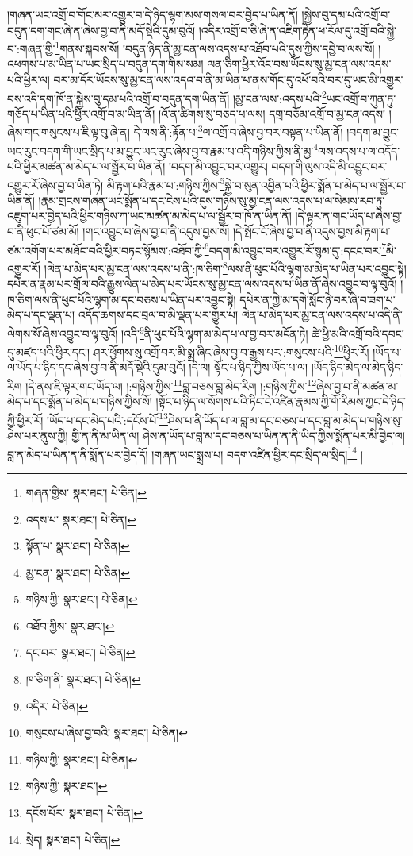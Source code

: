 །གཞན་ཡང་འགྲོ་བ་གོང་མར་འགྱུར་བ་དེ་ཉིད་ལྷག་མས་གསལ་བར་བྱེད་པ་ཡིན་ནོ། །སྐྱེས་བུ་དམ་པའི་འགྲོ་བ་བདུན་དག་གང་ཞེ་ན་ཞེས་བྱ་བ་ནི་མདོ་སྡེའི་དུམ་བུའོ། །འདིར་འགྲོ་བ་ཅི་ཞེ་ན་འཇིག་རྟེན་ཕ་རོལ་དུ་འགྲོ་བའི་སྐྱེ་བ་:གཞན་གྱི་\footnote{གཞན་གྱིས་  སྣར་ཐང་།  པེ་ཅིན། }གནས་སྐབས་སོ། །བདུན་ཉིད་ནི་མྱ་ངན་ལས་འདས་པ་འཐོབ་པའི་དུས་ཀྱིས་དབྱེ་བ་ལས་སོ། །འཕགས་པ་མ་ཡིན་པ་ཡང་སྲིད་པ་བདུན་དག་གིས་སམ། ལན་ཅིག་ཕྱིར་འོང་བས་ཡོངས་སུ་མྱ་ངན་ལས་འདས་པའི་ཕྱིར་ལ། བར་མ་དོར་ཡོངས་སུ་མྱ་ངན་ལས་འདའ་བ་ནི་མ་ཡིན་པ་ནས་གོང་དུ་འཕོ་བའི་བར་དུ་ཡང་མི་འགྱུར་བས་འདི་དག་ཁོ་ན་སྐྱེས་བུ་དམ་པའི་འགྲོ་བ་བདུན་དག་ཡིན་ནོ། །མྱ་ངན་ལས་:འདས་པའི་\footnote{འདས་པ་  སྣར་ཐང་།  པེ་ཅིན། }ཡང་འགྲོ་བ་ཀུན་ཏུ་གཅོད་པ་ཡིན་པའི་ཕྱིར་འགྲོ་བ་མ་ཡིན་ནོ། །འོ་ན་ཚིགས་སུ་བཅད་པ་ལས། དགྲ་བཅོམ་འགྲོ་བ་མྱ་ངན་འདས། །ཞེས་གང་གསུངས་པ་ཇི་ལྟ་བུ་ཞེ་ན། དེ་ལས་ནི་:རྟོན་པ་\footnote{སྟོན་པ་  སྣར་ཐང་།  པེ་ཅིན། }ལ་འགྲོ་བ་ཞེས་བྱ་བར་བསྟན་པ་ཡིན་ནོ། །བདག་མ་བྱུང་ཡང་རུང་བདག་གི་ཡང་སྲིད་པ་མ་བྱུང་ཡང་རུང་ཞེས་བྱ་བ་རྣམ་པ་འདི་གཉིས་ཀྱིས་ནི་མྱ་\footnote{མྱ་ངན་  སྣར་ཐང་།  པེ་ཅིན། }ལས་འདས་པ་ལ་འདོད་པའི་ཕྱིར་མཚན་མ་མེད་པ་ལ་སྦྱོར་བ་ཡིན་ནོ། །བདག་མི་འབྱུང་བར་འགྱུར། བདག་གི་ལུས་འདི་མི་འབྱུང་བར་འགྱུར་རོ་ཞེས་བྱ་བ་ཡིན་ཏེ། མི་རྟག་པའི་རྣམ་པ་:གཉིས་ཀྱིས་\footnote{གཉིས་ཀྱི་  སྣར་ཐང་།  པེ་ཅིན། }སྐྱེ་བ་སུན་འབྱིན་པའི་ཕྱིར་སྨོན་པ་མེད་པ་ལ་སྦྱོར་བ་ཡིན་ནོ། །རྣམ་གྲངས་གཞན་ཡང་སྨོན་པ་དང་ངེས་པའི་དུས་གཉིས་སུ་མྱ་ངན་ལས་འདས་པ་ལ་སེམས་རབ་ཏུ་འཇུག་པར་བྱེད་པའི་ཕྱིར་གཉིས་ཀ་ཡང་མཚན་མ་མེད་པ་ལ་སྦྱོར་བ་ཁོ་ན་ཡིན་ནོ། །དེ་ལྟར་ན་གང་ཡོད་པ་ཞེས་བྱ་བ་ནི་ཕུང་པོ་ཙམ་མོ། །གང་འབྱུང་བ་ཞེས་བྱ་བ་ནི་འདུས་བྱས་སོ། །དེ་སྤོང་ངོ་ཞེས་བྱ་བ་ནི་འདུས་བྱས་མི་རྟག་པ་ཙམ་འགོག་པར་མཐོང་བའི་ཕྱིར་བཏང་སྙོམས་:འཐོབ་ཀྱི་\footnote{འཐོབ་ཀྱིས་  སྣར་ཐང་། }བདག་མི་འབྱུང་བར་འགྱུར་རོ་སྙམ་དུ་:དངང་བར་\footnote{དང་བར་  སྣར་ཐང་།  པེ་ཅིན། }མི་འགྱུར་རོ། །ལེན་པ་མེད་པར་མྱ་ངན་ལས་འདས་པ་ནི་:ཁ་ཅིག་\footnote{ཁ་ཅིག་ནི་  སྣར་ཐང་།  པེ་ཅིན། }ལས་ནི་ཕུང་པོའི་ལྷག་མ་མེད་པ་ཡིན་པར་འབྱུང་སྟེ། དཔེར་ན་རྣམ་པར་གྲོལ་བའི་རྒྱུས་ལེན་པ་མེད་པར་ཡོངས་སུ་མྱ་ངན་ལས་འདས་པ་ཡིན་ནོ་ཞེས་འབྱུང་བ་ལྟ་བུའོ། །ཁ་ཅིག་ལས་ནི་ཕུང་པོའི་ལྷག་མ་དང་བཅས་པ་ཡིན་པར་འབྱུང་སྟེ། དཔེར་ན་ཀྱེ་མ་དགེ་སློང་ཉེ་བར་ཞི་བ་ཟག་པ་མེད་པ་དང་ལྡན་པ། འདོད་ཆགས་དང་བྲལ་བ་མི་ལྡན་པར་གྱུར་པ། ལེན་པ་མེད་པར་མྱ་ངན་ལས་འདས་པ་འདི་ནི་ལེགས་སོ་ཞེས་འབྱུང་བ་ལྟ་བུའོ། །འདི་\footnote{འདིར་  པེ་ཅིན། }ནི་ཕུང་པོའི་ལྷག་མ་མེད་པ་ལ་བྱ་བར་མངོན་ཏེ། ཚེ་ཕྱི་མའི་འགྲོ་བའི་དབང་དུ་མཛད་པའི་ཕྱིར་དང་། ཤར་ཕྱོགས་སུ་འགྲོ་བར་མི་སྨྲ་ཞིང་ཞེས་བྱ་བ་རྒྱས་པར་:གསུངས་པའི་\footnote{གསུངས་པ་ཞེས་བྱ་བའི་  སྣར་ཐང་།  པེ་ཅིན། }ཕྱིར་རོ། །ཡོད་པ་ལ་ཡོད་པ་ཉིད་དང་ཞེས་བྱ་བ་ནི་མདོ་སྡེའི་དུམ་བུའོ། །དེ་ལ། སྟོང་པ་ཉིད་ཀྱིས་ཡོད་པ་ལ། །ཡོད་ཉིད་མེད་ལ་མེད་ཉིད་རིག །དེ་ནས་ཇི་ལྟར་གང་ཡོད་ལ། །:གཉིས་ཀྱིས་\footnote{གཉིས་ཀྱི་  སྣར་ཐང་།  པེ་ཅིན། }བླ་བཅས་བླ་མེད་རིག །:གཉིས་ཀྱིས་\footnote{གཉིས་ཀྱི་  སྣར་ཐང་། }ཞེས་བྱ་བ་ནི་མཚན་མ་མེད་པ་དང་སྨོན་པ་མེད་པ་གཉིས་ཀྱིས་སོ། །སྟོང་པ་ཉིད་ལ་སོགས་པའི་ཏིང་ངེ་འཛིན་རྣམས་ཀྱི་གོ་རིམས་ཀྱང་དེ་ཉིད་ཀྱི་ཕྱིར་རོ། །ཡོད་པ་དང་མེད་པའི་:དངོས་པོ་\footnote{དངོས་པོར་  སྣར་ཐང་།  པེ་ཅིན། }ཤེས་པ་ནི་ཡོད་པ་ལ་བླ་མ་དང་བཅས་པ་དང་བླ་མ་མེད་པ་གཉིས་སུ་ཤེས་པར་ནུས་ཀྱི། གྱི་ན་ནི་མ་ཡིན་ལ། ཤེས་ན་ཡོད་པ་བླ་མ་དང་བཅས་པ་ཡིན་ན་ནི་ཡིད་ཀྱིས་སྨོན་པར་མི་བྱེད་ལ། བླ་ན་མེད་པ་ཡིན་ན་ནི་སྨོན་པར་བྱེད་དོ། །གཞན་ཡང་སྨྲས་པ། བདག་འཛིན་ཕྱིར་དང་སྲིད་ལ་སྲིད།\footnote{སྲེད།  སྣར་ཐང་།  པེ་ཅིན། } །
